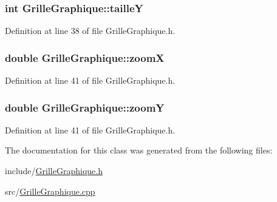 \subsubsection[{taille\+Y}]{\setlength{\rightskip}{0pt plus 5cm}int Grille\+Graphique\+::taille\+Y}\label{class_grille_graphique_a02037911fa5a2a342b3f90a15ad8d493}


Definition at line 38 of file Grille\+Graphique.\+h.

\hypertarget{class_grille_graphique_ab9d6cb5ea86ad3ebd816a44fabda13bb}{}
\subsubsection[{zoom\+X}]{\setlength{\rightskip}{0pt plus 5cm}double Grille\+Graphique\+::zoom\+X}\label{class_grille_graphique_ab9d6cb5ea86ad3ebd816a44fabda13bb}


Definition at line 41 of file Grille\+Graphique.\+h.

\hypertarget{class_grille_graphique_a24be5b0794bbb43e645a6ea562740d9c}{}
\subsubsection[{zoom\+Y}]{\setlength{\rightskip}{0pt plus 5cm}double Grille\+Graphique\+::zoom\+Y}\label{class_grille_graphique_a24be5b0794bbb43e645a6ea562740d9c}


Definition at line 41 of file Grille\+Graphique.\+h.



The documentation for this class was generated from the following files\+:\begin{DoxyCompactItemize}
\item 
include/\hyperlink{_grille_graphique_8h}{Grille\+Graphique.\+h}\item 
src/\hyperlink{_grille_graphique_8cpp}{Grille\+Graphique.\+cpp}\end{DoxyCompactItemize}
